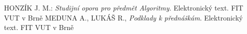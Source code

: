 \documentclass[12pt,a4paper,titlepage,final]{article}
\begin{document}
\begin{thebibliography}{1}

HONZÍK J. M.: \emph{Studijní opora pro předmět Algoritmy}. Elektronický text. FIT VUT v Brně
MEDUNA A., LUKÁŠ R., \emph{Podklady k přednáškám}. Elektronický text. FIT VUT v Brně


\end{thebibliography}
\appendix
\end{document}
